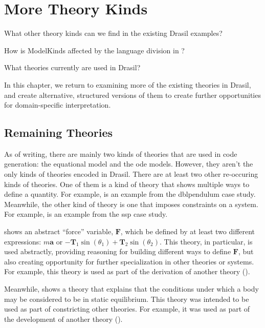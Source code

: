 \chapter{More Theory Kinds}
\label{chap:more-theory-kinds}

\begin{writingdirectives}
	\item What other theory kinds can we find in the existing Drasil examples?
	\item How is ModelKinds affected by the language division in
	?
	\item What theories currently are used in Drasil?
\end{writingdirectives}

In this chapter, we return to examining more of the existing theories in Drasil,
and create alternative, structured versions of them to create further
opportunities for domain-specific interpretation.

\section{Remaining Theories}
\label{chap:more-theory-kinds:sec:remaining-theories}

As of writing, there are mainly two kinds of theories that are used in code
generation: the equational model and the \acs{ode} models. However, they aren't
the only kinds of theories encoded in Drasil. There are at least two other
re-occuring kinds of theories. One of them is a kind of theory that shows
multiple ways to define a quantity. For example, 
is an example from the \acs{dblpendulum} case study. Meanwhile, the other kind
of theory is one that imposes constraints on a system. For example,
 is an example from the \acs{ssp} case
study.

 shows an abstract ``force'' variable,
\(\mathbf{F}\), which be defined by at least two different expressions: \(m
\mathbf{a}\) or \(-{\mathbf{T}_{1}}
\sin\left({\theta_{1}}\right)+{\mathbf{T}_{2}} \sin\left({\theta_{2}}\right)\).
This theory, in particular, is used abstractly, providing reasoning for building
different ways to define \(\mathbf{F}\), but also creating opportunity for
further specialization in other theories or systems. For example, this theory is
used as part of the derivation of another theory
().

Meanwhile,  shows a theory that explains
that the conditions under which a body may be considered to be in static
equilibrium. This theory was intended to be used as part of constricting other
theories. For example, it was used as part of the development of another theory
().

